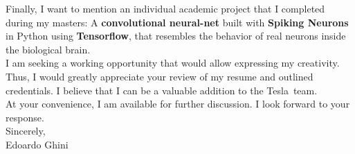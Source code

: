 \documentclass[11pt]{article}
\newcommand{\company}{Tesla}
\begin{document}
\begin{FlushLeft}
Finally, I want to mention an individual academic project that I completed during my masters:
  A \textbf{convolutional neural-net} built with \textbf{Spiking Neurons} in Python
  using \textbf{Tensorflow}, that resembles the behavior of real neurons inside the biological brain.\\
I am seeking a working opportunity that would allow expressing my creativity.
Thus, I would greatly appreciate your review of my resume and outlined credentials.
I believe that I can be a valuable addition to the \company\ team.\\\smallskip
At your convenience, I am available for further discussion. I look forward to your response.\\\bigskip
Sincerely,\\
Edoardo Ghini
\end{FlushLeft}
\end{document}
